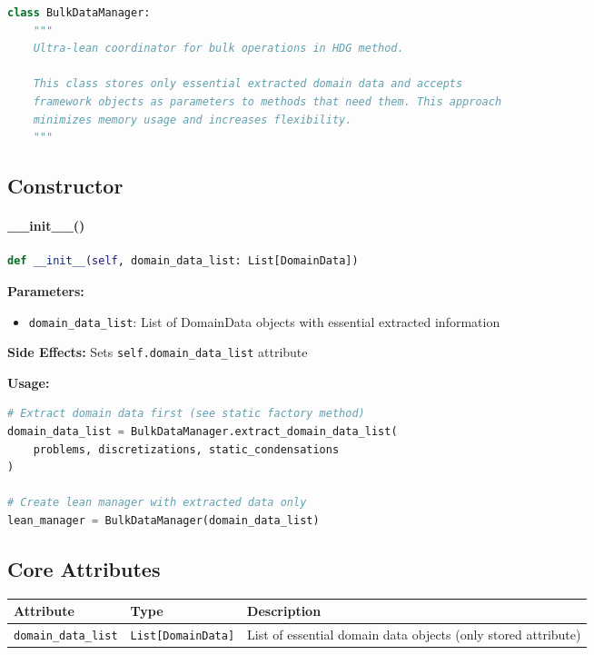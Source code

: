 \begin{lstlisting}[language=Python, caption=Class Declaration]
class BulkDataManager:
    """
    Ultra-lean coordinator for bulk operations in HDG method.
    
    This class stores only essential extracted domain data and accepts
    framework objects as parameters to methods that need them. This approach
    minimizes memory usage and increases flexibility.
    """
\end{lstlisting}

\subsection{Constructor}
\label{subsec:lean_constructor}

\paragraph{\_\_init\_\_()}\leavevmode
\begin{lstlisting}[language=Python, caption=Lean BulkDataManager Constructor]
def __init__(self, domain_data_list: List[DomainData])
\end{lstlisting}

\textbf{Parameters:}
\begin{itemize}
    \item \texttt{domain\_data\_list}: List of DomainData objects with essential extracted information
\end{itemize}

\textbf{Side Effects:} Sets \texttt{self.domain\_data\_list} attribute

\textbf{Usage:}
\begin{lstlisting}[language=Python, caption=Constructor Usage]
# Extract domain data first (see static factory method)
domain_data_list = BulkDataManager.extract_domain_data_list(
    problems, discretizations, static_condensations
)

# Create lean manager with extracted data only
lean_manager = BulkDataManager(domain_data_list)
\end{lstlisting}

\subsection{Core Attributes}
\label{subsec:lean_attributes}

\begin{longtable}{|p{3.5cm}|p{2.5cm}|p{7cm}|}
\hline
\textbf{Attribute} & \textbf{Type} & \textbf{Description} \\
\hline
\endhead

\texttt{domain\_data\_list} & \texttt{List[DomainData]} & List of essential domain data objects (only stored attribute) \\
\hline

\end{longtable}

